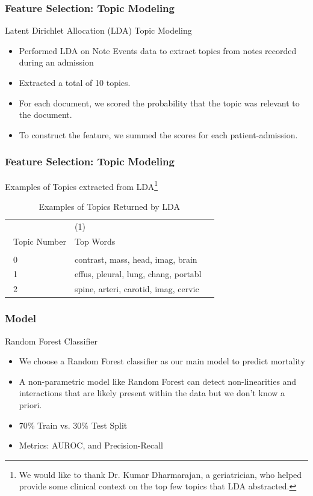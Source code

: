 \documentclass{beamer}
\begin{document}
\begin{frame}
\label{Feature Selection: Topic Modeling}
\frametitle{Feature Selection: Topic Modeling}

Latent Dirichlet Allocation (LDA) Topic Modeling

\begin{itemize}
\item Performed LDA on Note Events data to extract topics from notes recorded during an admission
\item Extracted a total of 10 topics.
\item For each document, we scored the probability that the topic was relevant to the document.
\item To construct the feature, we summed the scores for each patient-admission.
\end{itemize}
\end{frame}

\begin{frame}
\label{Feature Selection: Topic Modeling}
\frametitle{Feature Selection: Topic Modeling}

Examples of Topics extracted from LDA\footnote{We would like to thank Dr. Kumar Dharmarajan, a geriatrician, who helped provide some clinical context on the top few topics that LDA abstracted.}

\begin{table}[H]
\footnotesize
{}%
\caption{Examples of Topics Returned by LDA}
\label{LDA}
\centering
\begin{tabularx}{\textwidth}{l C C}\hline
 & (1) \\\
Topic Number & Top Words \\ \hline
 &    \\\
0 & contrast, mass, head, imag, brain  \\\
1 & effus, pleural, lung, chang, portabl \\\
2 & spine, arteri, carotid, imag, cervic
\end{tabularx}
\end{table}
\end{frame}

\begin{frame}
\label{Model}
\frametitle{Model}

Random Forest Classifier

\begin{itemize}
\item We choose a Random Forest classifier as our main model to predict mortality
\item A non-parametric model like Random Forest can detect non-linearities and interactions that are likely present within the data but we don't know a priori.
\item 70\% Train vs. 30\% Test Split
\item Metrics: AUROC, and Precision-Recall
\end{itemize}
\end{frame}
\end{document}
